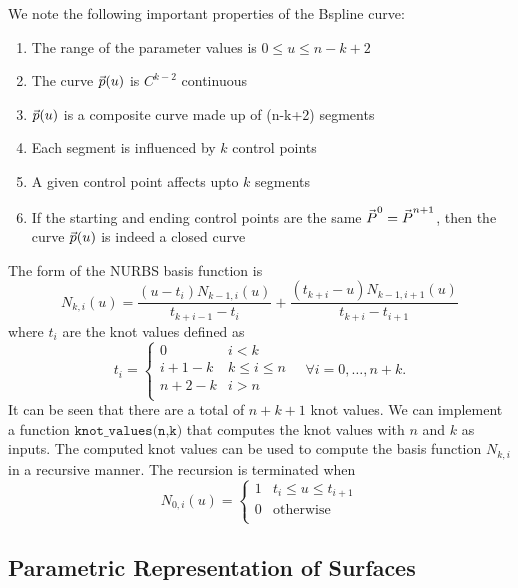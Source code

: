\documentclass[submit,12pt]{aiaa-pretty} %
\begin{document}
We note the following important properties of the Bspline curve:
\begin{enumerate}
\item The range of the parameter values is $0 \le u \le n-k+2$
\item The curve $\vec{\mkern0mup}(u)$ is $C^{k-2}$ continuous
\item $\vec{\mkern0mup}(u)$ is a composite curve made up of (n-k+2) segments
\item Each segment is influenced by $k$ control points
\item A given control point affects upto $k$ segments
\item If the starting and ending control points are the same $\vec{\mkern0muP}^0  = \vec{\mkern0muP}^{n+1}$, then the curve $\vec{\mkern0mup}(u)$ is indeed a closed curve
\end{enumerate}
The form of the NURBS basis function is
\begin{equation}
  N_{k,i}(u) = \frac{(u-t_i) N_{k-1,i}(u)}{t_{k+i-1}-t_i} + \frac{(t_{k+i}-u)N_{k-1,i+1}(u)}{t_{k+i}-t_{i+1}}
\end{equation}
where $t_i$ are the knot values defined as 
\begin{equation}
  t_i =
  \begin{cases}
    0 & i < k\\
    i+1 - k & k \le i \le n \\
    n+2 - k & i > n\\ 
  \end{cases}
\quad \forall i = 0,\ldots, n+k.
\end{equation}
It can be seen that there are a total of $n+k+1$ knot values. We can
implement a function $\texttt{knot\_values(n,k)}$ that computes the
knot values with $n$ and $k$ as inputs. The computed knot values can
be used to compute the basis function $N_{k,i}$ in a recursive manner.
The recursion is terminated when
\begin{equation}
  N_{0,i}(u) = 
  \begin{cases}
    1 & t_i \le u \le t_{i+1}    \\
    0 & \mathrm{otherwise} \\
  \end{cases}
\end{equation}

\subsection{Parametric Representation of Surfaces}
\end{document}
